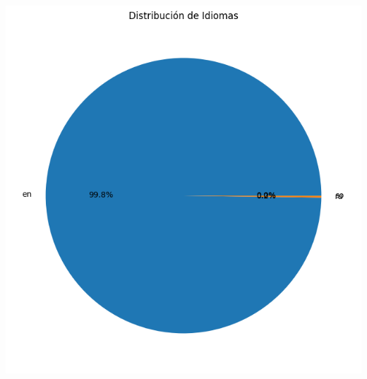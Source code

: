 \documentclass{article}
\begin{document}
\begin{itemize}
\begin{center}
              \includegraphics[scale=0.6]{imgs/langs_dist.png}
          \end{center}
          \newpage
          

\end{itemize}
\end{document}
